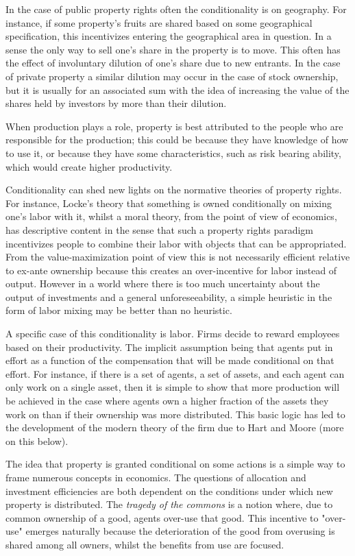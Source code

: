 \documentclass[12pt]{report}
\numberwithin{equation}{section}
\begin{document}
In the case of public property rights often the conditionality is on geography. For instance, if some property's fruits are shared based on some geographical specification, this incentivizes entering the geographical area in question. In a sense the only way to sell one's share in the property is to move. This often has the effect of involuntary dilution of one's share due to new entrants. In the case of private property a similar dilution may occur in the case of stock ownership, but it is usually for an associated sum with the idea of increasing the value of the shares held by investors by more than their dilution.

When production plays a role, property is best attributed to the people who are responsible for the production; this could be because they have knowledge of how to use it, or because they have some characteristics, such as risk bearing ability, which would create higher productivity.

Conditionality can shed new lights on the normative theories of property rights. For instance, Locke's theory that something is owned conditionally on mixing one's labor with it, whilst a moral theory, from the point of view of economics, has descriptive content in the sense that such a property rights paradigm incentivizes people to combine their labor with objects that can be appropriated. From the value-maximization point of view this is not necessarily efficient relative to ex-ante ownership because this creates an over-incentive for labor instead of output. However in a world where there is too much uncertainty about the output of investments and a general unforeseeability, a simple heuristic in the form of labor mixing may be better than no heuristic. 

A specific case of this conditionality is labor. Firms decide to reward employees based on their productivity. The implicit assumption being that agents put in effort as a function of the compensation that will be made conditional on that effort. For instance, if there is a set of agents, a set of assets, and each agent can only work on a single asset, then it is simple to show that more production will be achieved in the case where agents own a higher fraction of the assets they work on than if their ownership was more distributed. This basic logic has led to the development of the modern theory of the firm due to Hart and Moore (more on this below).

The idea that property is granted conditional on some actions is a simple way to frame numerous concepts in economics. The questions of allocation and investment efficiencies are both dependent on the conditions under which new property is distributed. The \textit{tragedy of the commons} is a notion where, due to common ownership of a good, agents over-use that good. This incentive to "over-use" emerges naturally because the deterioration of the good from overusing is shared among all owners, whilst the benefits from use are focused. 
\end{document}
